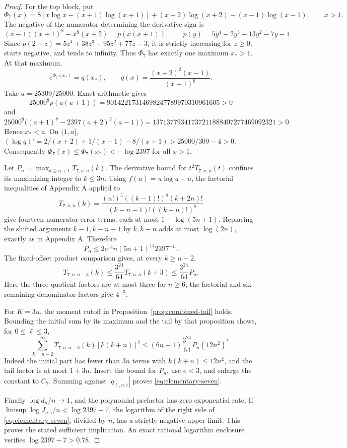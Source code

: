 \documentclass[11pt]{article}
\theoremstyle{remark}
\begin{document}
\begin{proof}
For the top block, put
\[
 \Phi_7(x)=8[x\log x-(x+1)\log(x+1)]
 +(x+2)\log(x+2)-(x-1)\log(x-1),\qquad x>1.
\]
The negative of the numerator determining the derivative sign is
\[
 (x-1)(x+1)^8-x^8(x+2)=p(x(x+1)),\qquad
 p(y)=5y^4-2y^3-13y^2-7y-1.
\]
Since
\(p(2+z)=5z^4+38z^3+95z^2+77z-3\), it is strictly increasing
for \(z\ge0\), starts negative, and tends to infinity. Thus \(\Phi_7\)
has exactly one maximum \(x_*>1\). At that maximum,
\[
 e^{\Phi_7(x_*)}=q(x_*),\qquad
 q(x)=\frac{(x+2)^2(x-1)}{(x+1)^8}.
\]
Take \(a=25309/25000\). Exact arithmetic gives
\[
 25000^8p(a(a+1))=90142217314698247789970310961605>0
\]
and
\[
 25000^8\bigl((a+1)^8-2397(a+2)^2(a-1)\bigr)
 =13713779341737211888407277469092321>0.
\]
Hence \(x_*<a\). On \((1,a]\),
\((\log q)'=2/(x+2)+1/(x-1)-8/(x+1)>25000/309-4>0\).
Consequently \(\Phi_7(x)\le\Phi_7(x_*)<-\log2397\) for all \(x>1\).

Let \(P_n=\max_{k\ge n+1}T_{7,n,n}(k)\). The derivative bound
for \(t^2T_{7,n,n}(t)\) confines its maximizing integer to \(k\le3n\).
Using \(f(u)=u\log u-u\), the factorial inequalities of Appendix A
applied to
\[
 T_{7,n,n}(k)=
 \frac{(n!)^5((k-1)!)^8(k+2n)!}
 {(k-n-1)!((k+n)!)^8}
\]
give fourteen numerator error terms, each at most \(1+\log(5n+1)\).
Replacing the shifted arguments \(k-1,k-n-1\) by \(k,k-n\)
adds at most \(\log(2n)\), exactly as in Appendix A. Therefore
\[
 P_n\le2e^{14}n(5n+1)^{14}2397^{-n}.
\]
The fixed-offset product comparison gives, at every \(k\ge n-2\),
\[
 T_{7,n,n-3}(k)\le\frac{3^{24}}{64}T_{7,n,n}(k+3)
 \le\frac{3^{24}}{64}P_n.
\]
Here the three quotient factors are at most three for \(n\ge6\);
the factorial and six remaining denominator factors give \(4^{-3}\).

For \(K=3n\), the moment cutoff in Proposition~\ref{prop:combined-tail}
holds. Bounding the initial sum by its maximum and the tail by that
proposition shows, for \(0\le\ell\le3\),
\[
 \sum_{k=n-2}^{\infty}T_{7,n,n-3}(k)[k(k+n)]^\ell
 \le(6n+1)\frac{3^{24}}{64}P_n(12n^2)^\ell.
\]
Indeed the initial part has fewer than \(3n\) terms with
\(k(k+n)\le12n^2\), and the tail factor is at most \(1+3n\).
Insert the bound for \(P_n\), use \(e<3\), and enlarge the constant
to \(C_7\). Summing against \(|q_{\ell,n,i}|\) proves
\eqref{eq:elementary-seven}.

Finally \(\log d_n/n\to1\), and the polynomial prefactor has zero
exponential rate. If \(\limsup\log J_{n,i}/n<\log2397-7\), the
logarithm of the right side of \eqref{eq:elementary-seven}, divided by
\(n\), has a strictly negative upper limit. This proves the stated
sufficient implication. An exact rational logarithm enclosure verifies
\(\log2397-7>0.78\).
\end{proof}
\end{document}
